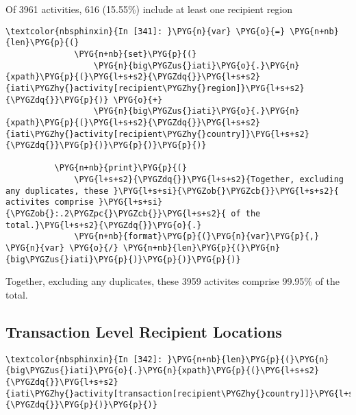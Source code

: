 \documentclass[letterpaper,10pt,english]{sphinxmanual}
\begin{document}
%
\begin{OriginalVerbatim}[commandchars=\\\{\}]
Of 3961 activities, 616 (15.55\%) include at least one recipient region
\end{OriginalVerbatim}
\relax
\begin{Verbatim}[commandchars=\\\{\}]
\textcolor{nbsphinxin}{In [341]: }\PYG{n}{var} \PYG{o}{=} \PYG{n+nb}{len}\PYG{p}{(}
              \PYG{n+nb}{set}\PYG{p}{(}
                  \PYG{n}{big\PYGZus{}iati}\PYG{o}{.}\PYG{n}{xpath}\PYG{p}{(}\PYG{l+s+s2}{\PYGZdq{}}\PYG{l+s+s2}{iati\PYGZhy{}activity[recipient\PYGZhy{}region]}\PYG{l+s+s2}{\PYGZdq{}}\PYG{p}{)} \PYG{o}{+}
                  \PYG{n}{big\PYGZus{}iati}\PYG{o}{.}\PYG{n}{xpath}\PYG{p}{(}\PYG{l+s+s2}{\PYGZdq{}}\PYG{l+s+s2}{iati\PYGZhy{}activity[recipient\PYGZhy{}country]}\PYG{l+s+s2}{\PYGZdq{}}\PYG{p}{)}\PYG{p}{)}\PYG{p}{)}
          
          \PYG{n+nb}{print}\PYG{p}{(}
              \PYG{l+s+s2}{\PYGZdq{}}\PYG{l+s+s2}{Together, excluding any duplicates, these }\PYG{l+s+si}{\PYGZob{}\PYGZcb{}}\PYG{l+s+s2}{ activites comprise }\PYG{l+s+si}{\PYGZob{}:.2\PYGZpc{}\PYGZcb{}}\PYG{l+s+s2}{ of the total.}\PYG{l+s+s2}{\PYGZdq{}}\PYG{o}{.}
              \PYG{n+nb}{format}\PYG{p}{(}\PYG{n}{var}\PYG{p}{,} \PYG{n}{var} \PYG{o}{/} \PYG{n+nb}{len}\PYG{p}{(}\PYG{n}{big\PYGZus{}iati}\PYG{p}{)}\PYG{p}{)}\PYG{p}{)}
\end{Verbatim}
%
\begin{OriginalVerbatim}[commandchars=\\\{\}]
Together, excluding any duplicates, these 3959 activites comprise 99.95\% of the total.
\end{OriginalVerbatim}
\relax

\subsection{Transaction Level Recipient Locations}
\label{\detokenize{Global Affairs Canada - Compliance Report:Transaction-Level-Recipient-Locations}}
\begin{Verbatim}[commandchars=\\\{\}]
\textcolor{nbsphinxin}{In [342]: }\PYG{n+nb}{len}\PYG{p}{(}\PYG{n}{big\PYGZus{}iati}\PYG{o}{.}\PYG{n}{xpath}\PYG{p}{(}\PYG{l+s+s2}{\PYGZdq{}}\PYG{l+s+s2}{iati\PYGZhy{}activity[transaction[recipient\PYGZhy{}country]]}\PYG{l+s+s2}{\PYGZdq{}}\PYG{p}{)}\PYG{p}{)}
\end{Verbatim}
\end{document}

